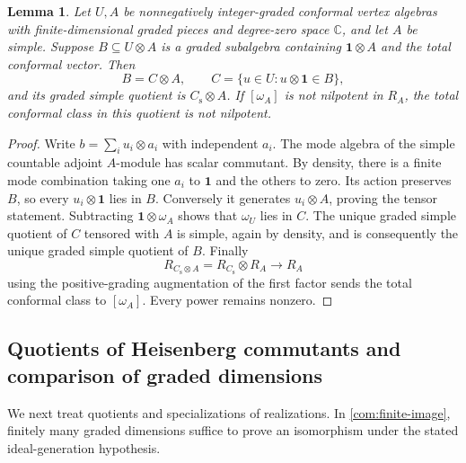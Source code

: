 \documentclass[11pt,a4paper]{amsart}
\numberwithin{equation}{section}
\newtheorem{lemma}[theorem]{Lemma}
\theoremstyle{definition}
\theoremstyle{remark}
\newcommand{\C}{\mathbb C}
\begin{document}
\begin{lemma}
\label{vtwo:whole-factor}
Let $U,A$ be nonnegatively integer-graded conformal vertex algebras with
finite-dimensional graded pieces and degree-zero space $\C$, and let $A$ be simple. Suppose
$B\subseteq U\otimes A$ is a graded subalgebra containing
$\mathbf1\otimes A$ and the total conformal vector. Then
$$
 B=C\otimes A,\qquad C=\{u\in U:u\otimes\mathbf1\in B\},
$$
and its graded simple quotient is $C_{\mathrm s}\otimes A$. If
$[\omega_A]$ is not nilpotent in $R_A$, the total conformal class in
this quotient is not nilpotent.
\end{lemma}
\begin{proof}
Write $b=\sum_i u_i\otimes a_i$ with independent $a_i$. The mode
algebra of the simple countable adjoint $A$-module has scalar commutant.
By density, there is a finite mode combination taking one $a_i$ to
$\mathbf1$ and the others to zero. Its action preserves $B$, so every
$u_i\otimes\mathbf1$ lies in $B$. Conversely it generates
$u_i\otimes A$, proving the tensor statement. Subtracting
$\mathbf1\otimes\omega_A$ shows that $\omega_U$ lies in $C$.
The unique graded simple quotient of $C$ tensored with $A$ is simple,
again by density, and is consequently the unique graded simple quotient
of $B$. Finally
$$
 R_{C_{\mathrm s}\otimes A}=R_{C_{\mathrm s}}\otimes R_A
       \longrightarrow R_A
$$
using the positive-grading augmentation of the first factor sends the
total conformal class to $[\omega_A]$. Every power remains nonzero.

\end{proof}

\subsection{Quotients of Heisenberg commutants and comparison of graded dimensions}
We next treat quotients and specializations of realizations. In
\cref{com:finite-image}, finitely many graded dimensions suffice to
prove an isomorphism under the stated ideal-generation hypothesis.
\end{document}
